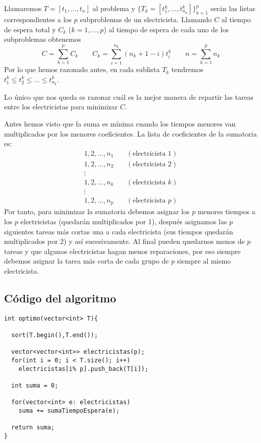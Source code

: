 \documentclass[a4]{article}
\begin{document}
Llamaremos $T=[t_1,\ldots,t_n]$ al problema y
$\{T_k=[t^k_1,\ldots,t^k_{n_k}]\}_{k=1}^p$ serán las listas
correspondientes a los $p$ subproblemas de un electricista. Llamando
$C$ al tiempo de espera total y $C_k$ ($k=1,\ldots,p$) al tiempo de
espera de cada uno de los subproblemas obtenemos
\[C=\sum_{k=1}^pC_k \qquad C_k=\sum_{i=1}^{n_k}(n_k+1-i)t_i^k \qquad
  n=\sum_{k=1}^pn_k\]
Por lo que hemos razonado antes, en cada sublista $T_k$ tendremos
$t_1^k \leq t_2^k \leq \ldots \leq t_{n_k}^k$.

Lo único que nos queda es razonar cuál es la mejor manera de repartir
las tareas entre los electricistas para minimizar $C$.

\newpage
Antes hemos visto que la suma es mínima cuando los tiempos menores van
multiplicados por los menores coeficientes. La lista de coeficientes
de la sumatoria es:
\begin{align*}
1,2,\ldots,n_1 \quad& (\text{electricista }1)\\
1,2,\ldots,n_2 \quad& (\text{electricista }2)\\
\vdots& \\
1,2,\ldots,n_k \quad& (\text{electricista }k)\\
\vdots& \\
1,2,\ldots,n_p \quad& (\text{electricista }p)                        
\end{align*}
Por tanto, para minimizar la sumatoria debemos asignar los $p$ menores
tiempos a los $p$ electricistas (quedarán multiplicados por 1),
después asignamos las $p$ siguientes tareas más cortas una a cada
electricista (sus tiempos quedarán multiplicados por 2) y así
sucesivamente. Al final pueden quedarnos menos de $p$ tareas y que
algunos electricistas hagan menos reparaciones, por eso siempre
debemos asignar la tarea más corta de cada grupo de $p$ siempre al
mismo electricista.

\subsection{Código del algoritmo}

\begin{lstlisting}
int optimo(vector<int> T){
  
  sort(T.begin(),T.end());

  vector<vector<int>> electricistas(p);
  for(int i = 0; i < T.size(); i++)
    electricistas[i% p].push_back(T[i]);

  int suma = 0;

  for(vector<int> e: electricistas)
    suma += sumaTiempoEspera(e);

  return suma;
}
\end{lstlisting}
\end{document}
